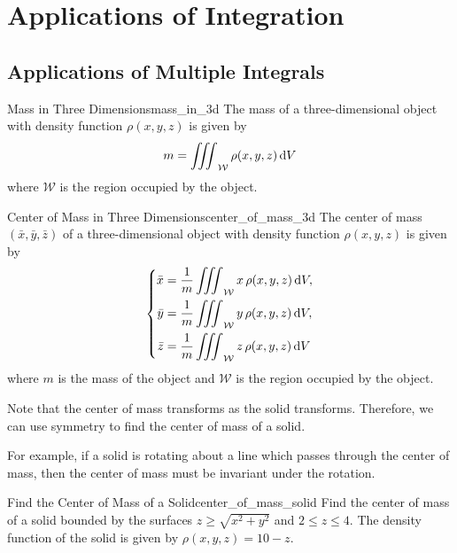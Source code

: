 \section{Applications of Integration}

\subsection{Applications of Multiple Integrals}

\begin{definition}{Mass in Three Dimensions}{mass_in_3d}
The mass of a three-dimensional object with density function $\rho(x, y, z)$ is given by
\[
m = \mathop{\int\mkern-10mu\int\mkern-10mu\int}\nolimits_{\mathcal{W}} \rho(x, y, z) \, \mathrm{d}V
\]
where $\mathcal{W}$ is the region occupied by the object.
\end{definition}

\begin{definition}{Center of Mass in Three Dimensions}{center_of_mass_3d}
The center of mass $(\bar{x}, \bar{y}, \bar{z})$ of a three-dimensional object with density function $\rho(x, y, z)$ is given by
\[
    \left\{
        \begin{aligned}
            \bar{x} &= \frac{1}{m} \wiiint{x\, \rho(x, y, z)}, \\
            \bar{y} &= \frac{1}{m} \wiiint{y\, \rho(x, y, z)}, \\
            \bar{z} &= \frac{1}{m} \wiiint{z\, \rho(x, y, z)}
        \end{aligned}
    \right.
\]
where $m$ is the mass of the object and $\mathcal{W}$ is the region occupied by the object.
\end{definition}

Note that the center of mass transforms as the solid transforms.
Therefore, we can use symmetry to find the center of mass of a solid.

For example, if a solid is rotating about a line which passes through the center of mass, then the center of mass must be invariant under the rotation.

\begin{problem}{Find the Center of Mass of a Solid}{center_of_mass_solid}
Find the center of mass of a solid bounded by the surfaces $z \geq \sqrt{x^2 + y^2}$ and $2 \leq z \leq 4$. 
The density function of the solid is given by $\rho(x, y, z) = 10 - z$.
\end{problem}

